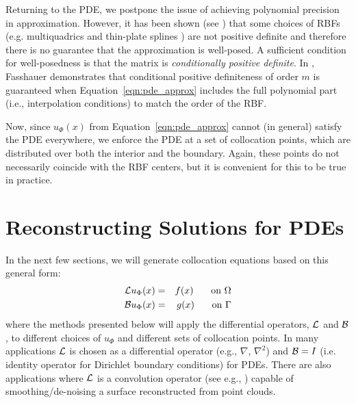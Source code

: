 \documentclass{report}
\begin{document}
{Returning to the PDE, we postpone the issue of  achieving polynomial precision in approximation. However, it has been shown (see \cite{Fasshauer2007, Iske2004}) that some choices of RBFs (e.g. multiquadrics and thin-plate splines \cite{Hon2001}) are not positive definite and therefore there is no guarantee that the approximation is well-posed. A sufficient condition for well-posedness is that the matrix is \emph{conditionally positive definite}. In \cite{Fasshauer2007}, Fasshauer demonstrates that conditional positive definiteness of order $m$ is guaranteed when Equation~\ref{eqn:pde_approx} includes the full polynomial part (i.e., interpolation conditions) to match the order of the RBF. 

Now, since $u_{\Phi}(x)$ from Equation~\ref{eqn:pde_approx} cannot (in general) satisfy the PDE everywhere, we enforce the PDE at a set of collocation points, which are  distributed over both the interior and the boundary. Again, these points do not necessarily coincide with the RBF centers, but it is convenient for this to be true in practice. 

\section{Reconstructing Solutions for PDEs}
In the next few sections, we will generate collocation equations based on this general form: 
\begin{eqnarray}
\diffop{u_\Phi(x)} &=& f(x) \on{\Interior} \label{eqn:colloc_interior}\\ 
\boundop{u_\Phi(x)} &=& g(x) \on{\Boundary}  \label{eqn:colloc_boundary} %
\end{eqnarray}
where the methods presented below will apply the differential operators, $\mathcal{L}$ and $\mathcal{B}$, to different choices of $u_\Phi$ and different sets of collocation points. In many applications $\mathcal{L}$ is chosen as a differential operator (e.g., $\nabla$, $\nabla^2$) and $\mathcal{B}= I$ (i.e. identity operator for Dirichlet boundary conditions) for PDEs. There are also  applications where $\mathcal{L}$ is a convolution operator (see e.g., \cite{Carr2001, Carr2003}) capable of smoothing/de-noising a surface reconstructed from point clouds. 

}
\end{document}
